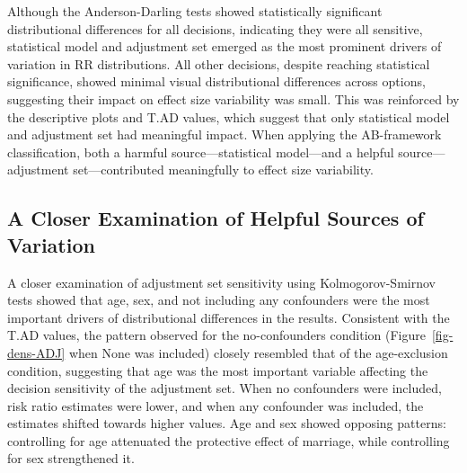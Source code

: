 \documentclass[
  man,
  floatsintext,
  longtable,
  nolmodern,
  notxfonts,
  notimes,
  colorlinks=true,linkcolor=blue,citecolor=blue,urlcolor=blue]{apa7}
\begin{document}
Although the Anderson-Darling tests showed statistically significant
distributional differences for all decisions, indicating they were all
sensitive, statistical model and adjustment set emerged as the most
prominent drivers of variation in RR distributions. All other decisions,
despite reaching statistical significance, showed minimal visual
distributional differences across options, suggesting their impact on
effect size variability was small. This was reinforced by the
descriptive plots and T.AD values, which suggest that only statistical
model and adjustment set had meaningful impact. When applying the
AB-framework classification, both a harmful source---statistical
model---and a helpful source---adjustment set---contributed meaningfully
to effect size variability.

\subsection{A Closer Examination of Helpful Sources of
Variation}\label{a-closer-examination-of-helpful-sources-of-variation}

A closer examination of adjustment set sensitivity using
Kolmogorov-Smirnov tests showed that age, sex, and not including any
confounders were the most important drivers of distributional
differences in the results. Consistent with the T.AD values, the pattern
observed for the no-confounders condition (Figure~\ref{fig-dens-ADJ}
when None was included) closely resembled that of the age-exclusion
condition, suggesting that age was the most important variable affecting
the decision sensitivity of the adjustment set. When no confounders were
included, risk ratio estimates were lower, and when any confounder was
included, the estimates shifted towards higher values. Age and sex
showed opposing patterns: controlling for age attenuated the protective
effect of marriage, while controlling for sex strengthened it.
\end{document}
